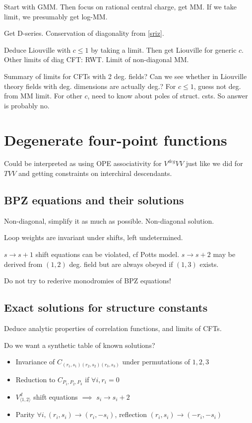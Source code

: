 \documentclass[12pt, a4paper]{article}
\theoremstyle{break}
\begin{document}
Start with GMM. Then focus on rational central charge, get MM. If we take limit, we presumably get log-MM. 

Get D-series. Conservation of diagonality from \eqref{sriz}.

Deduce Liouville with $c\leq 1$ by taking a limit. Then get Liouville for generic $c$. Other limits of diag CFT: RWT. Limit of non-diagonal MM.

Summary of limits for CFTs with 2 deg. fields? Can we see whether in Liouville theory fields with deg. dimensions are actually deg.? For $c\leq 1$, guess not deg. from MM limit. For other $c$, need to know about poles of struct. csts. So answer is probably no. 

\section{Degenerate four-point functions}

Could be interpreted as using OPE associativity for $V^{deg}VV$ just like we did for $TVV$ and getting constraints on interchiral descendants. 

\subsection{BPZ equations and their solutions}

Non-diagonal, simplify it as much as possible. Non-diagonal solution. 

Loop weights are invariant under shifts, left undetermined. 

$s\to s+1$ shift equations can be violated, cf Potts model. $s\to s+2$ may be derived from $(1,2)$ deg. field but are always obeyed if $(1,3)$ exists. 

Do not try to rederive monodromies of BPZ equations! 

\subsection{Exact solutions for structure constants}

Deduce analytic properties of correlation functions, and limits of CFTs. 

Do we want a synthetic table of known solutions? 

\begin{itemize}
\item Invariance of $C_{(r_1,s_1)(r_2,s_2)(r_3,s_3)}$ under permutations of $1,2,3$
\item Reduction to $C_{P_1,P_2,P_3}$ if $\forall i, r_i=0$ 
 \item $V_{\langle 1,2\rangle}^d$ shift equations $\implies$ $s_i\to s_i+2$  
 \item Parity $\forall i, (r_i,s_i)\to (r_i,-s_i)$, reflection $(r_i,s_i)\to (-r_i,-s_i)$
\end{itemize}
\end{document}
